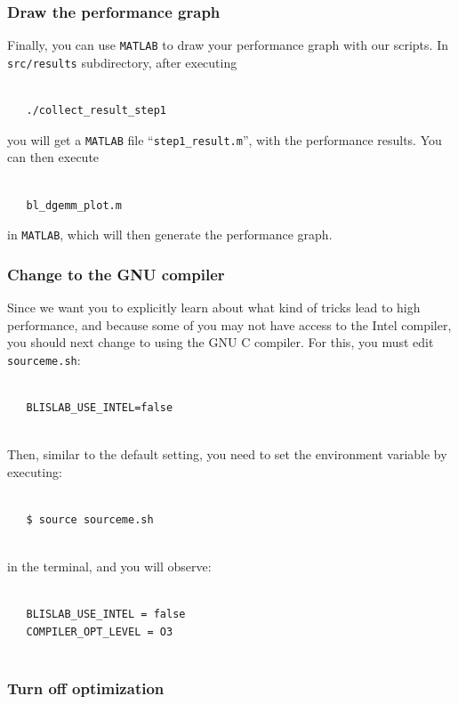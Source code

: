 \subsubsection{Draw the performance graph}

Finally, you can use {\tt MATLAB} to draw your performance graph with our scripts. In {\tt src/results} subdirectory, after executing 
\begin{verbatim}

   ./collect_result_step1

\end{verbatim}
you will get a {\tt MATLAB} file ``{\tt step1\_result.m}'', with the performance results. You can then execute 
\begin{verbatim}

   bl_dgemm_plot.m

\end{verbatim}
in {\tt MATLAB}, which will then generate the performance graph. %

\subsubsection{Change to the GNU compiler}

Since we want you to explicitly learn about what kind of tricks lead to high performance, and because some of you may not have access to the Intel compiler, you should next change to using the GNU C compiler.
For this, you must edit {\tt sourceme.sh}: 
\begin{verbatim}

   BLISLAB_USE_INTEL=false
   
\end{verbatim}
Then, similar to the default setting, you need to set the environment variable by executing:
\begin{verbatim}

   $ source sourceme.sh
   
\end{verbatim}
in the terminal, and you will observe:
\begin{verbatim}

   BLISLAB_USE_INTEL = false
   COMPILER_OPT_LEVEL = O3
   
\end{verbatim}

\subsubsection{Turn off optimization}

